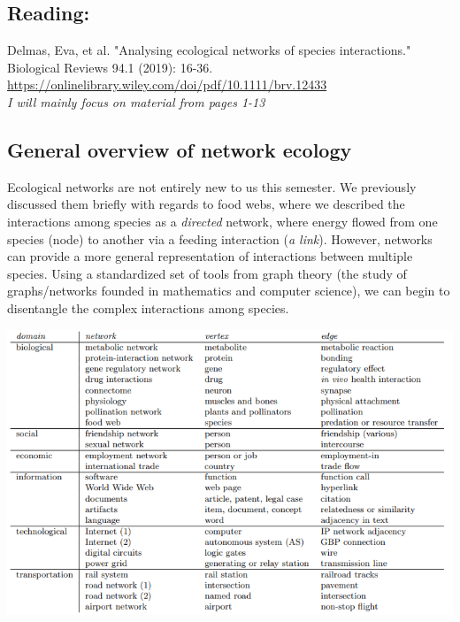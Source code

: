 \documentclass[12pt]{article}
\begin{document}
\subsection*{Reading:}

Delmas, Eva, et al. "Analysing ecological networks of species interactions." Biological Reviews 94.1 (2019): 16-36. \\
\url{https://onlinelibrary.wiley.com/doi/pdf/10.1111/brv.12433} \\

\textit{I will mainly focus on material from pages 1-13}













\begin{center}
\noindent\hrulefill 
\end{center}



\clearpage
\subsection*{General overview of network ecology}

Ecological networks are not entirely new to us this semester. We previously discussed them briefly with regards to food webs, where we described the interactions among species as a \textit{directed} network, where energy flowed from one species (node) to another via a feeding interaction (\textit{a link}). However, networks can provide a more general representation of interactions between multiple species. Using a standardized set of tools from graph theory (the study of graphs/networks founded in mathematics and computer science), we can begin to disentangle the complex interactions among species.



\includegraphics[width=\textwidth]{figs/netTypes.png}
\end{document}

